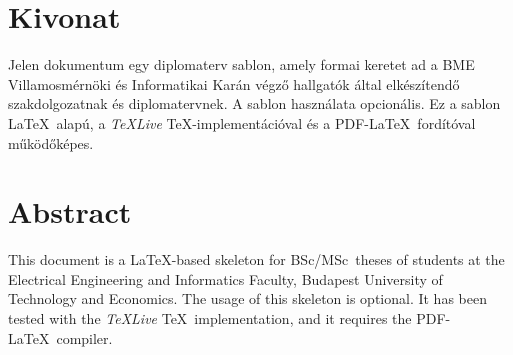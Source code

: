 \setcounter{page}{1}

\hungarianParagraph


\chapter*{Kivonat}

Jelen dokumentum egy diplomaterv sablon, amely formai keretet ad a BME Villamosmérnöki és Informatikai Karán végző hallgatók által elkészítendő szakdolgozatnak és diplomatervnek. A sablon használata opcionális. Ez a sablon \LaTeX~alapú, a \emph{TeXLive} \TeX-implementációval és a PDF-\LaTeX~fordítóval működőképes.


\vfill
{}
\englishParagraph


\chapter*{Abstract}

This document is a \LaTeX-based skeleton for BSc/MSc~theses of students at the Electrical Engineering and Informatics Faculty, Budapest University of Technology and Economics. The usage of this skeleton is optional. It has been tested with the \emph{TeXLive} \TeX~implementation, and it requires the PDF-\LaTeX~compiler.


\vfill
\dolgozatnyelve
{}

\setcounter{romanPage}{\value{page}}
